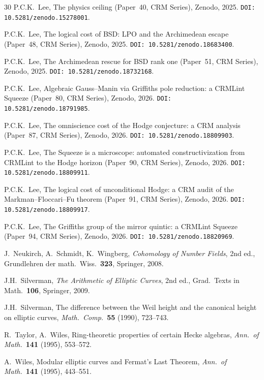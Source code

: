 \documentclass[11pt]{article}
\theoremstyle{plain}
\theoremstyle{definition}
\theoremstyle{remark}
\begin{document}
\begin{thebibliography}{30}
P.C.K.~Lee,
The physics ceiling (Paper~40, CRM Series),
Zenodo, 2025. \texttt{DOI: 10.5281/zenodo.15278001}.

P.C.K.~Lee,
The logical cost of BSD: LPO and the Archimedean escape (Paper~48, CRM Series),
Zenodo, 2025. \texttt{DOI: 10.5281/zenodo.18683400}.

P.C.K.~Lee,
The Archimedean rescue for BSD rank one (Paper~51, CRM Series),
Zenodo, 2025. \texttt{DOI: 10.5281/zenodo.18732168}.

P.C.K.~Lee,
Algebraic Gauss--Manin via Griffiths pole reduction: a CRMLint Squeeze (Paper~80, CRM Series),
Zenodo, 2026. \texttt{DOI: 10.5281/zenodo.18791985}.

P.C.K.~Lee,
The omniscience cost of the Hodge conjecture: a CRM analysis (Paper~87, CRM Series),
Zenodo, 2026. \texttt{DOI: 10.5281/zenodo.18809903}.

P.C.K.~Lee,
The Squeeze is a microscope: automated constructivization from CRMLint to the Hodge horizon (Paper~90, CRM Series),
Zenodo, 2026. \texttt{DOI: 10.5281/zenodo.18809911}.

P.C.K.~Lee,
The logical cost of unconditional Hodge: a CRM audit of the Markman--Floccari--Fu theorem (Paper~91, CRM Series),
Zenodo, 2026. \texttt{DOI: 10.5281/zenodo.18809917}.

P.C.K.~Lee,
The Griffiths group of the mirror quintic: a CRMLint Squeeze (Paper~94, CRM Series),
Zenodo, 2026. \texttt{DOI: 10.5281/zenodo.18820969}.

J.~Neukirch, A.~Schmidt, K.~Wingberg,
\emph{Cohomology of Number Fields}, 2nd ed.,
Grundlehren der math.\ Wiss.\ \textbf{323}, Springer, 2008.

J.H.~Silverman,
\emph{The Arithmetic of Elliptic Curves}, 2nd ed.,
Grad.\ Texts in Math.\ \textbf{106}, Springer, 2009.

J.H.~Silverman,
The difference between the Weil height and the canonical height on elliptic curves,
\emph{Math.\ Comp.}\ \textbf{55} (1990), 723--743.

R.~Taylor, A.~Wiles,
Ring-theoretic properties of certain Hecke algebras,
\emph{Ann.\ of Math.}\ \textbf{141} (1995), 553--572.

A.~Wiles,
Modular elliptic curves and Fermat's Last Theorem,
\emph{Ann.\ of Math.}\ \textbf{141} (1995), 443--551.

\end{thebibliography}
\end{document}
